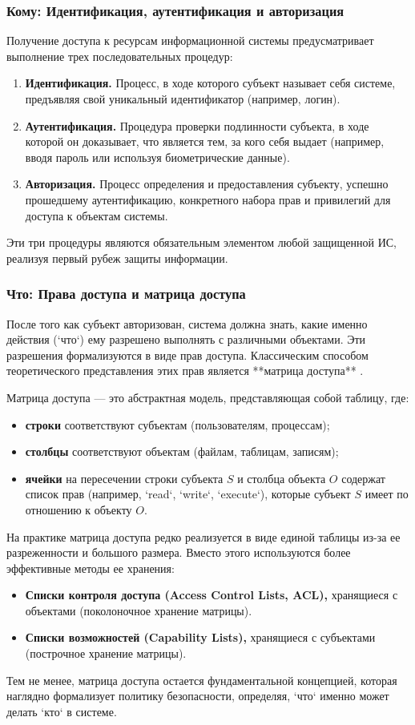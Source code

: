 \subsubsection{Кому: Идентификация, аутентификация и авторизация}
Получение доступа к ресурсам информационной системы предусматривает выполнение трех последовательных процедур:
\begin{enumerate}
	\item \textbf{Идентификация.} Процесс, в ходе которого субъект называет себя системе, предъявляя свой уникальный идентификатор (например, логин).
	\item \textbf{Аутентификация.} Процедура проверки подлинности субъекта, в ходе которой он доказывает, что является тем, за кого себя выдает (например, вводя пароль или используя биометрические данные).
	\item \textbf{Авторизация.} Процесс определения и предоставления субъекту, успешно прошедшему аутентификацию, конкретного набора прав и привилегий для доступа к объектам системы.
\end{enumerate}
Эти три процедуры являются обязательным элементом любой защищенной ИС, реализуя первый рубеж защиты информации.

\subsubsection{Что: Права доступа и матрица доступа}
После того как субъект авторизован, система должна знать, какие именно действия (`что`) ему разрешено выполнять с различными объектами. Эти разрешения формализуются в виде прав доступа. Классическим способом теоретического представления этих прав является **матрица доступа** \autocite{Tanenbaum}.

Матрица доступа — это абстрактная модель, представляющая собой таблицу, где:
\begin{itemize}
    \item \textbf{строки} соответствуют субъектам (пользователям, процессам);
    \item \textbf{столбцы} соответствуют объектам (файлам, таблицам, записям);
    \item \textbf{ячейки} на пересечении строки субъекта $S$ и столбца объекта $O$ содержат список прав (например, `read`, `write`, `execute`), которые субъект $S$ имеет по отношению к объекту $O$.
\end{itemize}

На практике матрица доступа редко реализуется в виде единой таблицы из-за ее разреженности и большого размера. Вместо этого используются более эффективные методы ее хранения:
\begin{itemize}
    \item \textbf{Списки контроля доступа (Access Control Lists, ACL),} хранящиеся с объектами (поколоночное хранение матрицы).
    \item \textbf{Списки возможностей (Capability Lists),} хранящиеся с субъектами (построчное хранение матрицы).
\end{itemize}
Тем не менее, матрица доступа остается фундаментальной концепцией, которая наглядно формализует политику безопасности, определяя, `что` именно может делать `кто` в системе.

\clearpage
